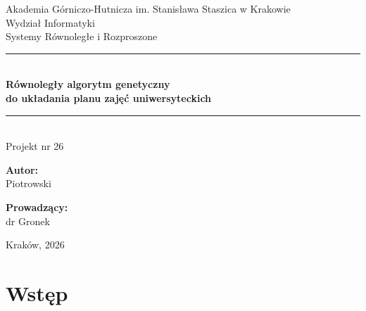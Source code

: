 \documentclass[12pt,a4paper]{article}
\begin{document}
\begin{titlepage}
  \centering
  \vspace*{1cm}

  {\large Akademia G\'{o}rniczo-Hutnicza im. Stanis\l{}awa Staszica w Krakowie}\\[0.3cm]
  {\large Wydzia\l{} Informatyki}\\[2cm]

  {\Large Systemy R\'{o}wnoleg\l{}e i Rozproszone}\\[1.5cm]

  \rule{\textwidth}{0.4pt}\\[0.5cm]
  {\LARGE\bfseries R\'{o}wnoleg\l{}y algorytm genetyczny\\do uk\l{}adania planu zaj\k{e}\'{c} uniwersyteckich}\\[0.3cm]
  \rule{\textwidth}{0.4pt}\\[0.5cm]

  {\large Projekt nr 26}\\[2cm]

  \begin{minipage}{0.5\textwidth}
    \begin{flushleft}
      {\large\textbf{Autor:}}\\
      Piotrowski
    \end{flushleft}
  \end{minipage}
  \begin{minipage}{0.4\textwidth}
    \begin{flushright}
      {\large\textbf{Prowadz\k{a}cy:}}\\
      dr Gronek
    \end{flushright}
  \end{minipage}

  \vfill
  {\large Krak\'{o}w, 2026}
\end{titlepage}

\newpage
\tableofcontents
\newpage

\section{Wst\k{e}p}
\end{document}
